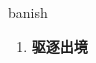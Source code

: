 
\begin{frame}
{\huge banish}
\begin{center}
\begin{enumerate}\Large
  \item \textbf{驱逐出境}
\end{enumerate}
\end{center}
\end{frame}
